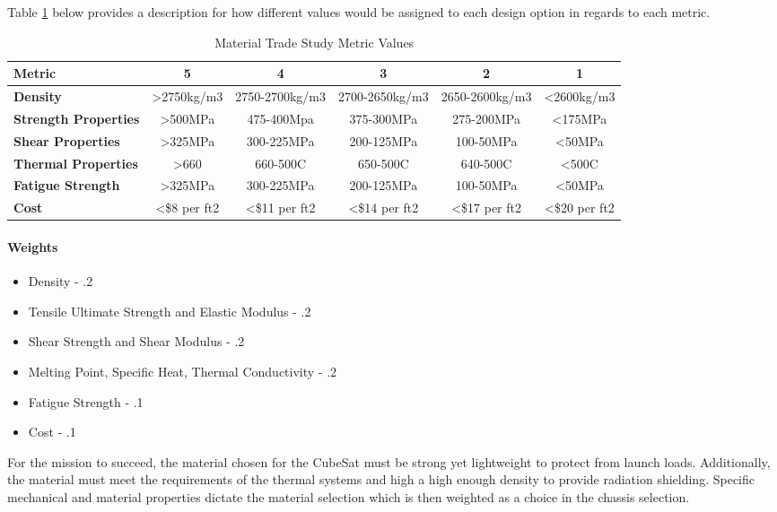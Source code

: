 \documentclass{ece}
\begin{document}
Table \ref{tbl:material_Metric_Scores} below provides a description for how different values would be assigned to each design option in regards to each metric. 

\begin{table}[H]
\centering
\begin{tabular}{|l|c|c|c|c|c|} 
\hline
    \textbf{Metric} & \textbf{5} & \textbf{4} & \textbf{3} & \textbf{2} & \textbf{1}
    \\
\hline
    \textbf{Density} & >2750kg/m3 & 2750-2700kg/m3 & 2700-2650kg/m3 & 2650-2600kg/m3 & <2600kg/m3
    \\
\hline
    \textbf{Strength Properties} & >500MPa & 475-400Mpa & 375-300MPa & 275-200MPa & <175MPa 
    \\
\hline
    \textbf{Shear Properties} & >325MPa & 300-225MPa & 200-125MPa & 100-50MPa & <50MPa 
    \\
\hline
    \textbf{Thermal Properties} & >660 & 660-500C & 650-500C & 640-500C & <500C 
    \\
\hline
    \textbf{Fatigue Strength} & >325MPa & 300-225MPa & 200-125MPa & 100-50MPa & <50MPa 
    \\
\hline
    \textbf{Cost} & <\$8 per ft2 & <\$11 per ft2 & <\$14 per ft2 & <\$17 per ft2 & <\$20 per ft2
    \\

\hline
\end{tabular}
\caption{Material Trade Study Metric Values}
\label{tbl:material_Metric_Scores}
\end{table}

\paragraph{Weights}
\begin{itemize}
    \item Density - .2
    \item Tensile Ultimate Strength and Elastic Modulus - .2
    \item Shear Strength and Shear Modulus - .2
    \item Melting Point, Specific Heat, Thermal Conductivity - .2
    \item Fatigue Strength - .1
    \item Cost - .1
\end{itemize}

For the mission to succeed, the material chosen for the CubeSat must be strong yet lightweight to protect from launch loads. Additionally, the material must meet the requirements of the thermal systems and high a high enough density to provide radiation shielding. Specific mechanical and material properties dictate the material selection which is then weighted as a choice in the chassis selection.
\end{document}
